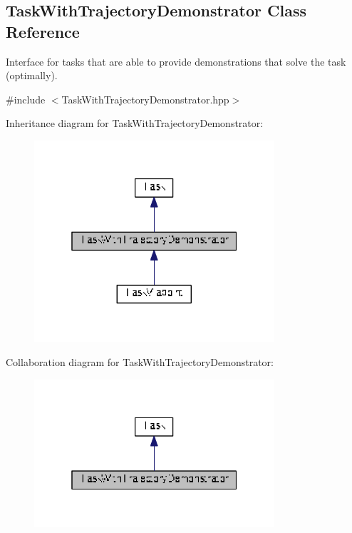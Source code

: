 \hypertarget{classDmpBbo_1_1TaskWithTrajectoryDemonstrator}{\subsection{Task\+With\+Trajectory\+Demonstrator Class Reference}
\label{classDmpBbo_1_1TaskWithTrajectoryDemonstrator}
}


Interface for tasks that are able to provide demonstrations that solve the task (optimally).  




{\ttfamily \#include $<$Task\+With\+Trajectory\+Demonstrator.\+hpp$>$}



Inheritance diagram for Task\+With\+Trajectory\+Demonstrator\+:
\nopagebreak
\begin{figure}[H]
\begin{center}
\leavevmode
\includegraphics[width=253pt]{classDmpBbo_1_1TaskWithTrajectoryDemonstrator__inherit__graph}
\end{center}
\end{figure}


Collaboration diagram for Task\+With\+Trajectory\+Demonstrator\+:
\nopagebreak
\begin{figure}[H]
\begin{center}
\leavevmode
\includegraphics[width=253pt]{classDmpBbo_1_1TaskWithTrajectoryDemonstrator__coll__graph}
\end{center}
\end{figure}
